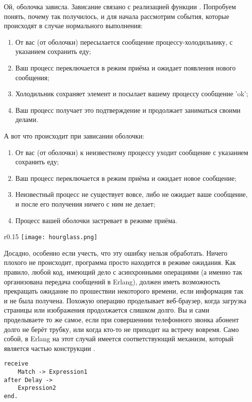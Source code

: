 Ой, оболочка зависла.
Зависание связано с реализацией функции .
Попробуем понять, почему так получилось, и для начала рассмотрим события, которые происходят в случае нормального выполнения:
\begin{enumerate}
    \item От вас (от оболочки) пересылается сообщение процессу\--холодильнику, с указанием сохранить еду;
    \item Ваш процесс переключается в режим приёма и ожидает появления нового сообщения;
    \item Холодильник сохраняет элемент и посылает вашему процессу сообщение 'ok';
    \item Ваш процесс получает это подтверждение и продолжает заниматься своими делами.
\end{enumerate}
А вот что происходит при зависании оболочки:
\begin{enumerate}
    \item От вас (от оболочки) к неизвестному процессу уходит сообщение с указанием сохранить еду;
    \item Ваш процесс переключается в режим приёма и ожидает новое сообщение;
    \item Неизвестный процесс не существует вовсе, либо не ожидает ваше сообщение, и после его получения ничего с ним не делает;
    \item Процесс вашей оболочки застревает в режиме приёма.
\end{enumerate}
\begin{wrapfigure}{r}{0.15\linewidth}
    \texttt{[image: hourglass.png]}
\end{wrapfigure}

Досадно, особенно если учесть, что эту ошибку нельзя обработать.
Ничего плохого не происходит, программа просто находится в режиме ожидания.
Как правило, любой код, имеющий дело с асинхронными операциями (а именно так организована передача сообщений в Erlang), должен иметь возможность прекращать ожидание по прошествии некоторого времени, если информация так и не была получена.
Похожую операцию проделывает веб\--браузер, когда загрузка страницы или изображения продолжается слишком долго.
Вы и сами проделываете то же самое, если при совершеннии телефонного звонка абонент долго не берёт трубку, или когда кто\--то не приходит на встречу вовремя.
Само собой, в Erlang на этот случай имеется соответствующий механизм, который является частью конструкции .
\begin{lstlisting}[style=erlang]
receive
    Match -> Expression1
after Delay ->
    Expression2
end.
\end{lstlisting}

